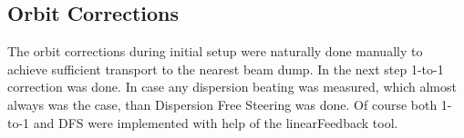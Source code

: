 \subsection{Orbit Corrections}

The orbit corrections during initial setup were naturally done manually to achieve 
sufficient transport to the nearest beam dump. 
In the next step 1-to-1 correction was done. In case any dispersion beating was measured,
which almost always was the case, than Dispersion Free Steering was done. 
Of course both 1-to-1 and DFS were implemented with help of the linearFeedback tool.


